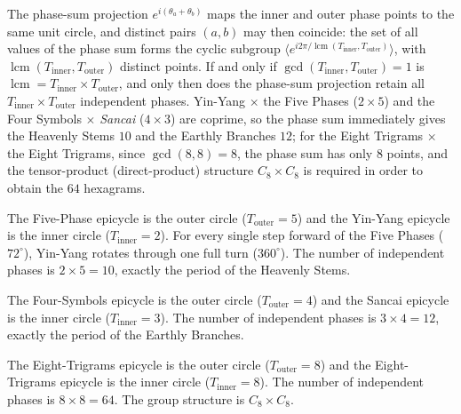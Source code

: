 \begin{remark}\label{ch20_epicycle_gcd_boundary}
The phase-sum projection $e^{i(\theta_a + \theta_b)}$ maps the inner and outer phase points to the same unit circle, and distinct pairs $(a,b)$ may then coincide: the set of all values of the phase sum forms the cyclic subgroup $\langle e^{i2\pi/\operatorname{lcm}(T_{\text{inner}},T_{\text{outer}})}\rangle$, with $\operatorname{lcm}(T_{\text{inner}}, T_{\text{outer}})$ distinct points. If and only if $\gcd(T_{\text{inner}}, T_{\text{outer}}) = 1$ is $\operatorname{lcm} = T_{\text{inner}} \times T_{\text{outer}}$, and only then does the phase-sum projection retain all $T_{\text{inner}} \times T_{\text{outer}}$ independent phases. Yin-Yang $\times$ the Five Phases ($2 \times 5$) and the Four Symbols $\times$ \textit{Sancai} ($4 \times 3$) are coprime, so the phase sum immediately gives the Heavenly Stems $10$ and the Earthly Branches $12$; for the Eight Trigrams $\times$ the Eight Trigrams, since $\gcd(8,8) = 8$, the phase sum has only $8$ points, and the tensor-product (direct-product) structure $C_8 \times C_8$ is required in order to obtain the $64$ hexagrams.
\end{remark}

\begin{example}\label{ex:tiangan_generation}
The Five-Phase epicycle is the outer circle ($T_{\text{outer}} = 5$) and the Yin-Yang epicycle is the inner circle ($T_{\text{inner}} = 2$). For every single step forward of the Five Phases ($72^\circ$), Yin-Yang rotates through one full turn ($360^\circ$). The number of independent phases is $2 \times 5 = 10$, exactly the period of the Heavenly Stems.
\end{example}

\begin{example}\label{ex:dizhi_generation}
The Four-Symbols epicycle is the outer circle ($T_{\text{outer}} = 4$) and the Sancai epicycle is the inner circle ($T_{\text{inner}} = 3$). The number of independent phases is $3 \times 4 = 12$, exactly the period of the Earthly Branches.
\end{example}

\begin{example}\label{ex:liushisigua_generation}
The Eight-Trigrams epicycle is the outer circle ($T_{\text{outer}} = 8$) and the Eight-Trigrams epicycle is the inner circle ($T_{\text{inner}} = 8$). The number of independent phases is $8 \times 8 = 64$. The group structure is $C_8 \times C_8$.
\end{example}

